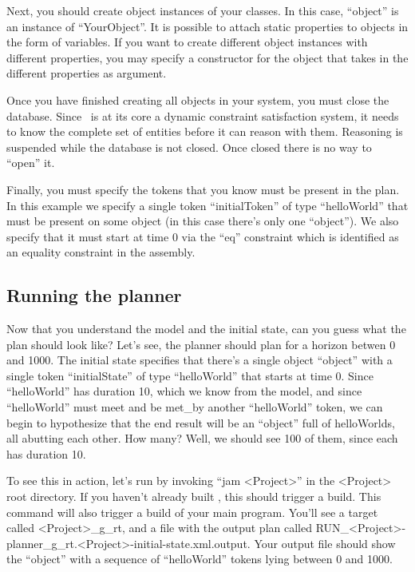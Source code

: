 \documentclass[10pt, letterpaper, twoside]{article}
\begin{document}
{Next, you should create object instances of your classes.  In this case,
``object'' is an instance of ``YourObject''.  It is possible to attach
static properties to objects in the form of variables.  If you want to
create different object instances with different properties, you may
specify a constructor for the object that takes in the different properties
as argument. 

Once you have finished creating all objects in your system, you must close
the database.  Since \ET\, is at its core a dynamic constraint satisfaction
system, it needs to know the complete set of entities before it can reason
with them.  Reasoning is suspended while the database is not closed.  Once
closed there is no way to ``open'' it.

Finally, you must specify the tokens that you know must be present in the
plan.  In this example we specify a single token ``initialToken'' of type
``helloWorld'' that must be present on some object (in this case there's
only one ``object'').  We also specify that it must start at time 0 via the
``eq'' constraint which is identified as an equality constraint in the
assembly. 

\subsection{Running the planner}
Now that you understand the model and the initial state, can you guess what
the plan should look like?  Let's see, the planner should plan for a
horizon betwen 0 and 1000.  The initial state specifies that there's a
single object ``object'' with a single token ``initialState'' of type
``helloWorld'' that starts at time 0.  Since ``helloWorld'' has duration
10, which we know from the model, and since ``helloWorld'' must meet and be
met\_by another ``helloWorld'' token, we can begin to hypothesize that the
end result will be an ``object'' full of helloWorlds, all abutting each
other.  How many? Well, we should see 100 of them, since each has duration 10.

To see this in action, let's run by invoking ``jam <Project>'' in
the <Project> root directory.  If you haven't already built \ET, this
should trigger a build.  This command will also trigger a build of your
main program. You'll see a target called <Project>\_g\_rt, and a file with
the output plan called
RUN\_<Project>-planner\_g\_rt.<Project>-initial-state.xml.output.
Your output file should show the ``object'' with a sequence of
``helloWorld'' tokens lying between 0 and 1000.

}
\end{document}
